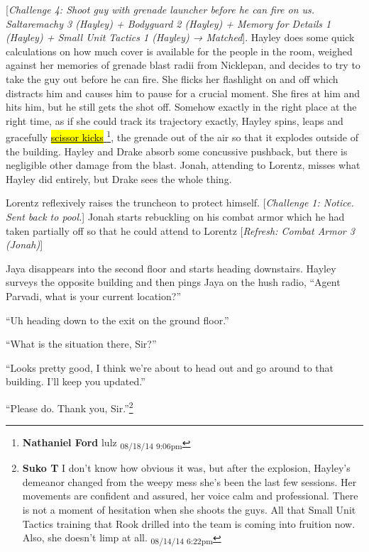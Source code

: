 {[}\textit{Challenge 4: Shoot guy with grenade launcher before he can fire on us.  Saltaremachy 3 (Hayley) + Bodyguard 2 (Hayley) + Memory for Details 1 (Hayley) + Small Unit Tactics 1 (Hayley) → Matched}{]}.  Hayley does some quick calculations on how much cover is available for the people in the room, weighed against her memories of grenade blast radii from Nicklepan, and decides to try to take the guy out before he can fire.  She flicks her flashlight on and off which distracts him and causes him to pause for a crucial moment.  She fires at him and hits him, but he still gets the shot off.  Somehow exactly in the right place at the right time, as if she could track its trajectory exactly, Hayley spins, leaps and gracefully \underline{  {\color[RGB]{17,85,204}\hl{scissor kicks}}  }\footnote{\textbf{Nathaniel Ford }lulz \textsubscript{08/18/14 9:06pm}}, the grenade out of the air so that it explodes outside of the building.  Hayley and Drake absorb some concussive pushback, but there is negligible other damage from the blast.  Jonah, attending to Lorentz, misses what Hayley did entirely, but Drake sees the whole thing.



Lorentz reflexively raises the truncheon to protect himself.  {[}\textit{Challenge 1: Notice. Sent back to pool.}{]}  Jonah starts rebuckling on his combat armor which he had taken partially off so that he could attend to Lorentz {[}\textit{Refresh: Combat Armor 3 (Jonah)}{]}



Jaya disappears into the second floor and starts heading downstairs.  Hayley surveys the opposite building and then pings Jaya on the hush radio, ``Agent Parvadi, what is your current location?''

``Uh heading down to the exit on the ground floor.''

``What is the situation there, Sir?''

``Looks pretty good, I think we're about to head out and go around to that building.  I'll keep you updated.''

``Please do. Thank you, Sir.''\footnote{\textbf{Suko T }I don't know how obvious it was, but after the explosion, Hayley's demeanor changed from the weepy mess she's been the last few sessions.  Her movements are confident and assured, her voice calm and professional.  There is not a moment of hesitation when she shoots the guys.  All that Small Unit Tactics training that Rook drilled into the team is coming into fruition now.  Also, she doesn't limp at all. \textsubscript{08/14/14 6:22pm}}



